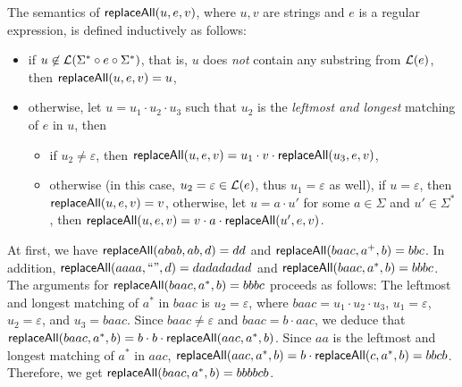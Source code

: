 \begin{definition} \label{def:replaceall}
The semantics of $\mathsf{replaceAll}(u, e, v)$, where $u, v$ are strings and $e$ is a regular expression, is defined inductively as follows:
\begin{itemize}
%	
%
	\item if $u \not \in \mathcal{L}(\Sigma^\ast \circ e \circ \Sigma^\ast)$, that is, $u$ does \emph{not} contain any substring from $\mathcal{L}(e)$, then $\mathsf{replaceAll}(u, e, v) = u$, 
	\item otherwise, let $u = u_1 \cdot u_2 \cdot u_3$ such that $u_2$ is the \emph{leftmost and longest} matching of $e$ in $u$, then 
	\begin{itemize}
	\item if $u_2 \neq \varepsilon$, then $\mathsf{replaceAll}(u, e, v) = u_1 \cdot v \cdot \mathsf{replaceAll}(u_3, e, v)$,
	\item otherwise (in this case, $u_2 = \varepsilon \in \mathcal{L}(e)$, thus $u_1 = \varepsilon$ as well), if $u = \varepsilon$, then $\mathsf{replaceAll}(u, e, v) = v$, otherwise,  let $u = a \cdot u'$ for some $a \in \Sigma$ and $u' \in \Sigma^*$, then $\mathsf{replaceAll}(u, e, v) = v \cdot a \cdot \mathsf{replaceAll}(u', e, v)$. 
	\end{itemize}
\end{itemize}
\end{definition}

\begin{example}
At first, we have $\mathsf{replaceAll}(abab, ab, d) =dd$ and $\mathsf{replaceAll}(baac, a^+, b)=bbc$. In addition, $\mathsf{replaceAll}(aaaa, ``", d) =dadadadad$ and $\mathsf{replaceAll}(baac, a^*, b) =bbbc$.  The arguments for $\mathsf{replaceAll}(baac, a^*, b) = bbbc$ proceeds as follows: The leftmost and longest matching of $a^*$ in $baac$ is $u_2 =\varepsilon$, where $baac = u_1 \cdot u_2 \cdot u_3$, $u_1 = \varepsilon$, $u_2 = \varepsilon$, and $u_3 = baac$. Since $baac \neq \varepsilon$ and $baac = b \cdot aac$, we deduce that $\mathsf{replaceAll}(baac, a^*, b) = b \cdot b \cdot \mathsf{replaceAll}(aac, a^*, b)$. Since $aa$ is the leftmost and longest matching of $a^*$ in $aac$, $\mathsf{replaceAll}(aac, a^*, b) = b \cdot \mathsf{replaceAll}(c, a^*, b) = bbcb$. Therefore, we get $\mathsf{replaceAll}(baac, a^*, b) = bb bb cb$.
\end{example}

